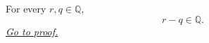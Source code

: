 \begin{lemma}
\label{lem:rational-difference-preserves-rationality}
For every $r,q\in\mathbb{Q}$,
\[
  r-q\in\mathbb{Q}.
\]
\hyperref[prf:rational-difference-preserves-rationality]{\textit{Go to proof.}}
\end{lemma}